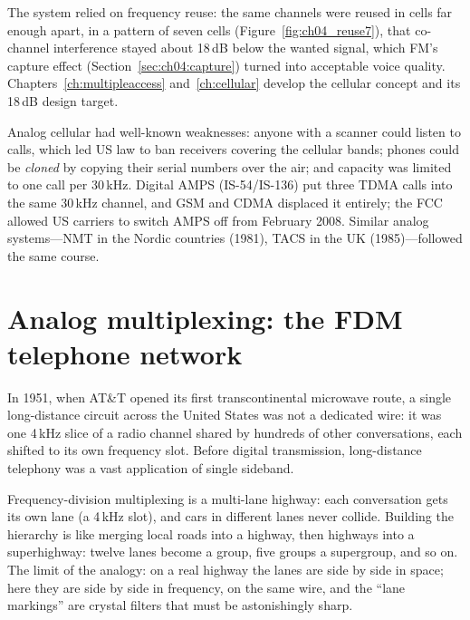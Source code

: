 The system relied on frequency reuse: the same channels were reused in cells far enough apart, in a pattern of
seven cells (Figure~\ref{fig:ch04_reuse7}), that co-channel interference stayed about 18\,dB below the wanted
signal, which FM's capture effect (Section~\ref{sec:ch04:capture}) turned into acceptable voice quality.
Chapters~\ref{ch:multipleaccess} and~\ref{ch:cellular} develop the cellular concept and its 18\,dB design
target.

Analog cellular had well-known weaknesses: anyone with a scanner could listen to calls, which led US law to ban
receivers covering the cellular bands; phones could be \emph{cloned} by copying their serial numbers over the
air; and capacity was limited to one call per 30\,kHz. Digital AMPS (IS-54/IS-136) put three TDMA calls into the
same 30\,kHz channel, and GSM and CDMA displaced it entirely; the FCC allowed US carriers to switch AMPS off from
February 2008. Similar analog systems---NMT in the Nordic countries (1981), TACS in the UK (1985)---followed the
same course.

\section{Analog multiplexing: the FDM telephone network}
\label{sec:ch04:fdm}

In 1951, when AT\&T opened its first transcontinental microwave route, a single long-distance circuit across
the United States was not a dedicated wire: it was one 4\,kHz slice of a radio channel shared by hundreds of
other conversations, each shifted to its own frequency slot. Before digital transmission, long-distance
telephony was a vast application of single sideband.

\begin{analogy}
Frequency-division multiplexing is a multi-lane highway: each conversation gets its own lane (a 4\,kHz slot),
and cars in different lanes never collide. Building the hierarchy is like merging local roads into a highway,
then highways into a superhighway: twelve lanes become a group, five groups a supergroup, and so on. The limit
of the analogy: on a real highway the lanes are side by side in space; here they are side by side in
frequency, on the same wire, and the ``lane markings'' are crystal filters that must be astonishingly sharp.
\end{analogy}

